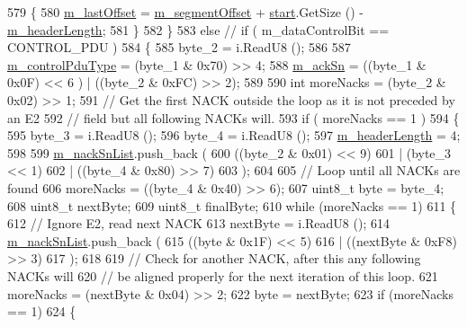 \begin{DoxyCode}
579         \{
580           \hyperlink{classns3_1_1LteRlcAmHeader_a5bfb0edfc4cef2ecb484448e466d6f14}{m\_lastOffset} = \hyperlink{classns3_1_1LteRlcAmHeader_aaab2313fbca4a24854b05767219216f4}{m\_segmentOffset} + \hyperlink{namespacevisualizer_1_1core_a2a35e5d8a34af358b508dac8635754e0}{start}.GetSize () - 
      \hyperlink{classns3_1_1LteRlcAmHeader_a3c565f3b6b45d813ea11f05118898fe8}{m\_headerLength}; 
581         \}
582     \}
583   \textcolor{keywordflow}{else} \textcolor{comment}{// if ( m\_dataControlBit == CONTROL\_PDU )}
584     \{
585       byte\_2 = i.ReadU8 ();
586 
587       \hyperlink{classns3_1_1LteRlcAmHeader_a9e0eb15e5fc0eeda48c0b62cd5f3fd1d}{m\_controlPduType} = (byte\_1 & 0x70) >> 4;
588       \hyperlink{classns3_1_1LteRlcAmHeader_a95d8ee6ccdb69d68bd28c8a8f3257b1c}{m\_ackSn} = ((byte\_1 & 0x0F) << 6 ) | ((byte\_2 & 0xFC) >> 2);
589 
590       \textcolor{keywordtype}{int} moreNacks = (byte\_2 & 0x02) >> 1;
591       \textcolor{comment}{// Get the first NACK outside the loop as it is not preceded by an E2}
592       \textcolor{comment}{// field but all following NACKs will.}
593       \textcolor{keywordflow}{if} ( moreNacks == 1 )
594         \{
595           byte\_3 = i.ReadU8 ();
596           byte\_4 = i.ReadU8 ();
597           \hyperlink{classns3_1_1LteRlcAmHeader_a3c565f3b6b45d813ea11f05118898fe8}{m\_headerLength} = 4;
598 
599           \hyperlink{classns3_1_1LteRlcAmHeader_ae9feb3d09099ed90ed014d3f0fa8591b}{m\_nackSnList}.push\_back (
600             ((byte\_2 & 0x01) << 9)
601             | (byte\_3 << 1)
602             | ((byte\_4 & 0x80) >> 7)
603           );
604 
605          \textcolor{comment}{// Loop until all NACKs are found}
606          moreNacks = ((byte\_4 & 0x40) >> 6);
607          uint8\_t byte = byte\_4;
608          uint8\_t nextByte;
609          uint8\_t finalByte;
610          \textcolor{keywordflow}{while} (moreNacks == 1)
611            \{
612              \textcolor{comment}{// Ignore E2, read next NACK}
613              nextByte = i.ReadU8 ();
614              \hyperlink{classns3_1_1LteRlcAmHeader_ae9feb3d09099ed90ed014d3f0fa8591b}{m\_nackSnList}.push\_back (
615               ((byte & 0x1F) << 5)
616               | ((nextByte & 0xF8) >> 3)
617             );
618 
619             \textcolor{comment}{// Check for another NACK, after this any following NACKs will}
620             \textcolor{comment}{// be aligned properly for the next iteration of this loop.}
621             moreNacks = (nextByte & 0x04) >> 2;
622             byte = nextByte;
623             \textcolor{keywordflow}{if} (moreNacks == 1)
624               \{

\end{DoxyCode}
